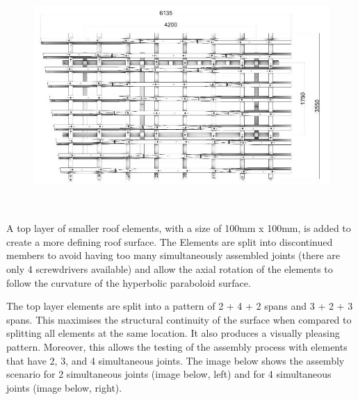 \documentclass[11pt]{book}
\begin{document}
\begin{figure}[H]
\includegraphics[width=14.33cm,height=8.67cm]{./images/image19.jpeg}
\end{figure}


A top layer of smaller roof elements, with a size of 100mm x 100mm, is added to create a more defining roof surface. The Elements are split into discontinued members to avoid having too many simultaneously assembled joints (there are only 4 screwdrivers available) and allow the axial rotation of the elements to follow the curvature of the hyperbolic paraboloid surface. 

The top layer elements are split into a pattern of 2 + 4 + 2 spans and 3 + 2 + 3 spans. This maximises the structural continuity of the surface when compared to splitting all elements at the same location. It also produces a visually pleasing pattern. Moreover, this allows the testing of the assembly process with elements that have 2, 3, and 4 simultaneous joints. The image below shows the assembly scenario for 2 simultaneous joints (image below, left) and for 4 simultaneous joints (image below, right).
\end{document}
